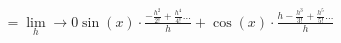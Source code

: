 \documentclass[preview]{standalone}
\begin{document}
\begin{align*}
= \lim_ h \to 0  \sin(x) \cdot \frac{- \frac{h^2}{2!} + \frac{h^4}{4!} \dots}{h} + \cos(x) \cdot \frac{h - \frac{h^3}{3!} + \frac{h^5}{5!} \dots}{h}
\end{align*}
\end{document}
